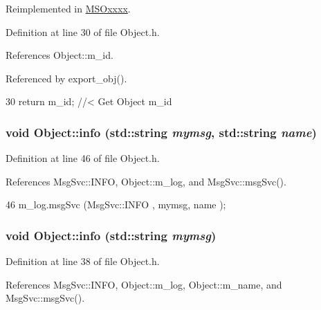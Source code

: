Reimplemented in \hyperlink{classMSOxxxx_a0f14b23d31d8e7647184e99a89600cc3}{MSOxxxx}.

Definition at line 30 of file Object.h.

References Object::m\_\-id.

Referenced by export\_\-obj().


\begin{DoxyCode}
30 { return m_id;         } //< Get Object m_id 
\end{DoxyCode}
\hypertarget{classObject_a1ca123253dfd30fc28b156f521dcbdae}{
\subsubsection[{info}]{\setlength{\rightskip}{0pt plus 5cm}void Object::info (std::string {\em mymsg}, \/  std::string {\em name})}}
\label{classObject_a1ca123253dfd30fc28b156f521dcbdae}


Definition at line 46 of file Object.h.

References MsgSvc::INFO, Object::m\_\-log, and MsgSvc::msgSvc().


\begin{DoxyCode}
46 { m_log.msgSvc (MsgSvc::INFO    , mymsg, name ); }
\end{DoxyCode}
\hypertarget{classObject_a644fd329ea4cb85f54fa6846484b84a8}{
\subsubsection[{info}]{\setlength{\rightskip}{0pt plus 5cm}void Object::info (std::string {\em mymsg})}}
\label{classObject_a644fd329ea4cb85f54fa6846484b84a8}


Definition at line 38 of file Object.h.

References MsgSvc::INFO, Object::m\_\-log, Object::m\_\-name, and MsgSvc::msgSvc().

